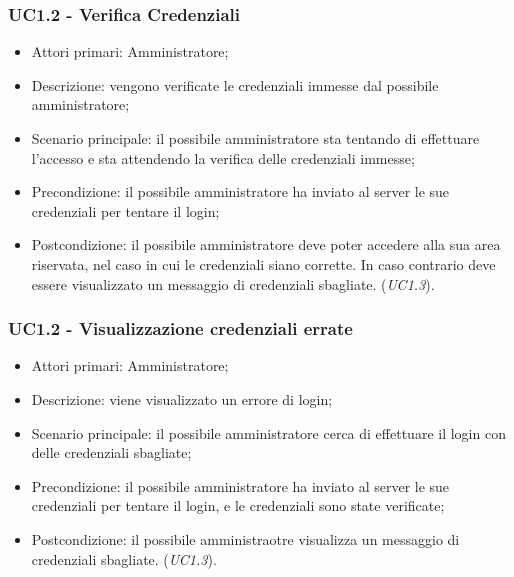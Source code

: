 \subsubsection{UC1.2 - Verifica Credenziali}

\begin{itemize}
\item Attori primari: Amministratore;
\item Descrizione: vengono verificate le credenziali immesse dal possibile amministratore;
\item Scenario principale: il possibile amministratore sta tentando di effettuare l'accesso e sta attendendo la verifica delle credenziali immesse;
\item Precondizione: il possibile amministratore ha inviato al server le sue credenziali per tentare il login;
\item Postcondizione: il possibile amministratore deve poter accedere alla sua area riservata, nel caso in cui le credenziali siano corrette. In caso
contrario deve essere visualizzato un messaggio di credenziali sbagliate. (\emph{UC1.3}).

\end{itemize}


\subsubsection{UC1.2 - Visualizzazione credenziali errate}

\begin{itemize}
\item Attori primari: Amministratore;
\item Descrizione: viene visualizzato un errore di login;
\item Scenario principale: il possibile amministratore cerca di effettuare il login con delle credenziali sbagliate;
\item Precondizione: il possibile amministratore ha inviato al server le sue credenziali per tentare il login, e le credenziali sono state verificate;
\item Postcondizione: il possibile amministraotre visualizza un messaggio di credenziali sbagliate. (\emph{UC1.3}).

\end{itemize}